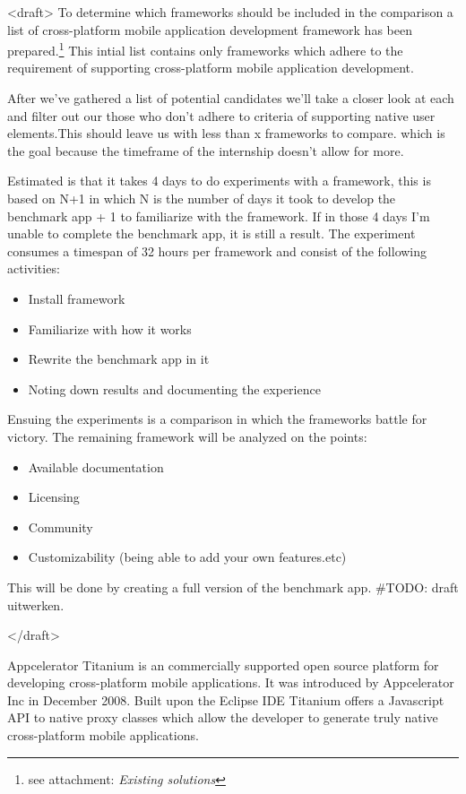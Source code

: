 <draft>
To determine which frameworks should be included in the comparison a list of cross-platform mobile application development framework has been prepared.\footnote{see attachment: \emph{Existing solutions}} This intial list contains only frameworks which adhere to the requirement of supporting cross-platform mobile application development.

After we've gathered a list of potential candidates we'll take a closer look at each and filter out our those who don't adhere to criteria of supporting native user elements.This should leave us with less than x frameworks to compare. which is the goal because the timeframe of the internship doesn't allow for more. 

Estimated is that it takes 4 days to do experiments with a framework, this is based on N+1 in which N is the number of days it took to develop the benchmark app + 1 to familiarize with the framework. If in those 4 days I'm unable to complete the benchmark app, it is still a result. The experiment consumes a timespan of 32 hours per framework and consist of the following activities:

\begin{itemize}
\item Install framework
\item Familiarize with how it works
\item Rewrite the benchmark app in it
\item Noting down results and documenting the experience
\end{itemize}

Ensuing the experiments is a comparison in which the frameworks battle for victory.
The remaining framework will be analyzed on the points:
\begin{itemize}
\item Available documentation	
\item Licensing
\item Community
\item Customizability (being able to add your own features.etc)
\end{itemize}

This will be done by creating a full version of the benchmark app.
\#TODO: draft uitwerken.

</draft>



Appcelerator Titanium is an commercially supported open source platform for developing cross-platform mobile applications. It was introduced by Appcelerator Inc in December 2008. Built upon the Eclipse IDE Titanium offers a Javascript API to native proxy classes which allow the developer to generate truly native cross-platform mobile applications. 

